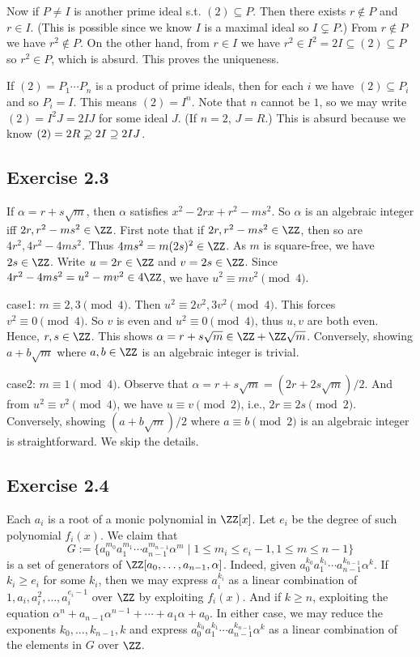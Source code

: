 \documentclass[../Chapter.tex]{subfiles}
\begin{document}
Now if $P\neq I$ is another prime ideal s.t. $(2)\subseteq P$. Then there exists $r\notin P$ and $r\in I$. (This is possible since we know $I$ is a maximal ideal so $I\varsubsetneq P$.) From $r\notin P$ we have $r^2\notin P$. On the other hand, from $r\in I$ we have $r^2\in I^2=2I \subseteq (2)\subseteq P$ so $r^2\in P$, which is absurd. This proves the uniqueness.

If $(2)=P_1\cdots P_n$ is a product of prime ideals, then for each $i$ we have $(2)\subseteq P_i$ and so $P_i=I$. This means $(2)=I^n$. Note that $n$ cannot be $1$, so we may write $(2)=I^2J=2IJ$ for some ideal $J$. (If $n=2$, $J=R$.) This is absurd because we know $(2)=2R\varsupsetneq 2I \supseteq 2IJ$.

\subsection*{Exercise 2.3}

If $\alpha=r+s\sqrt{m}$, then $\alpha$ satisfies $x^2-2rx+r^2-ms^2$. So $\alpha$ is an algebraic integer iff $2r,r^2-ms^2\in\ZZ$. First note that if $2r,r^2-ms^2\in\ZZ$, then so are $4r^2,4r^2-4ms^2$. Thus $4ms^2=m(2s)^2\in\ZZ$. As $m$ is square-free, we have $2s\in\ZZ$. Write $u=2r\in\ZZ$ and $v=2s\in\ZZ$. Since $4r^2-4ms^2=u^2-mv^2\in 4\ZZ$, we have $u^2 \equiv mv^2 \pmod{4}$.

case1: $m \equiv 2,3 \pmod{4}$. Then $u^2 \equiv 2v^2,3v^2 \pmod{4}$. This forces $v^2 \equiv 0 \pmod{4}$. So $v$ is even and $u^2 \equiv 0 \pmod{4}$, thus $u,v$ are both even. Hence, $r,s\in \ZZ$. This shows $\alpha=r+s\sqrt{m}\in \ZZ+\ZZ\sqrt{m}$. Conversely, showing $a+b\sqrt{m}$ where $a,b\in\ZZ$ is an algebraic integer is trivial.

case2: $m \equiv 1 \pmod{4}$. Observe that $\alpha=r+s\sqrt{m}=(2r+2s\sqrt{m})/2$. And from $u^2 \equiv v^2 \pmod{4}$, we have $u \equiv v \pmod{2}$, i.e., $2r \equiv 2s \pmod{2}$. Conversely, showing $(a+b\sqrt{m})/2$ where $a \equiv b \pmod{2}$ is an algebraic integer is straightforward. We skip the details.

\subsection*{Exercise 2.4}

Each $a_i$ is a root of a monic polynomial in $\ZZ[x]$. Let $e_i$ be the degree of such polynomial $f_i(x)$. We claim that $$G:=\{a_0^{m_0}a_1^{m_1}\cdots a_{n-1}^{m_{n-1}}\alpha^m \mid 1\leq m_i \leq e_i-1,1\leq m\leq n-1\}$$ is a set of generators of $\ZZ[a_0,\ldots,a_{n-1},\alpha]$. Indeed, given $a_0^{k_0}a_1^{k_1}\cdots a_{n-1}^{k_{n-1}}\alpha^k$. If $k_i\geq e_i$ for some $k_i$, then we may express $a_i^{k_i}$ as a linear combination of $1,a_i,a_i^2,\ldots,a_i^{e_i-1}$ over $\ZZ$ by exploiting $f_i(x)$. And if $k\geq n$, exploiting the equation $\alpha^n+a_{n-1}\alpha^{n-1}+\cdots+a_1\alpha+a_0$. In either case, we may reduce the exponents $k_0,\ldots,k_{n-1},k$ and express $a_0^{k_0}a_1^{k_1}\cdots a_{n-1}^{k_{n-1}}\alpha^k$ as a linear combination of the elements in $G$ over $\ZZ$.
\end{document}
